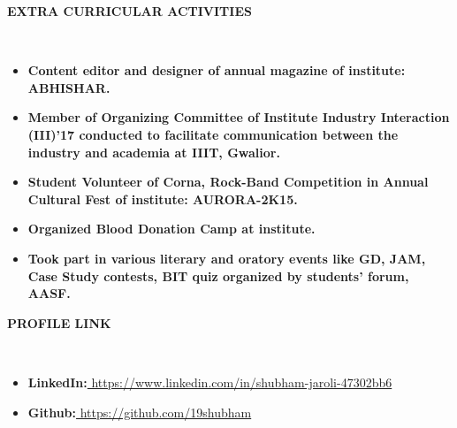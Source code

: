 \documentclass[a4paper,10pt]{article}
\newcommand{\lsep}{-0.5cm}
\newcommand{\resheading}[1]{{\small \colorbox{mygrey}{\begin{minipage}{0.975\textwidth}{\textbf{#1 \vphantom{p\^{E}}}}\end{minipage}}}}
\begin{document}
\resheading{\textbf{EXTRA CURRICULAR ACTIVITIES} }\\[\lsep]
\begin{itemize}
\item \noindent \textbf{Content editor and designer of annual magazine of institute: ABHISHAR.}
\item \noindent \textbf{Member of Organizing Committee of Institute Industry Interaction (III)'17 conducted to facilitate communication between the industry and academia at IIIT, Gwalior.}
\item \noindent \textbf{Student Volunteer of Corna, Rock-Band Competition in Annual Cultural Fest of institute: AURORA-2K15.} 
\item \noindent \textbf{Organized Blood Donation Camp at institute.}
\item \noindent \textbf{Took part in various literary and oratory events like GD, JAM, Case Study contests, BIT quiz organized by students' forum, AASF.}
\end{itemize}

\resheading{\textbf{PROFILE LINK} }\\[\lsep]
\begin{itemize}
\item \noindent \textbf{LinkedIn:}\href{https://www.linkedin.com/in/shubham-jaroli-47302bb6}{ https://www.linkedin.com/in/shubham-jaroli-47302bb6}

\item \noindent \textbf{Github:}\href{https://github.com/19shubham}{ https://github.com/19shubham}

\end{itemize}
\end{document}

